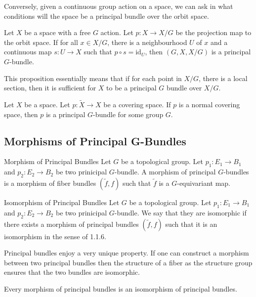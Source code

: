 \documentclass[a4paper]{article}
\begin{document}
Conversely, given a continuous group action on a space, we can ask in what conditions will the space be a principal bundle over the orbit space. 

\begin{prp}{}{} Let $X$ be a space with a free $G$ action. Let $p:X\to X/G$ be the projection map to the orbit space. If for all $x\in X/G$, there is a neighbourhood $U$ of $x$ and a continuous map $s:U\to X$ such that $p\circ s=\text{id}_U$, then $(G,X,X/G)$ is a principal $G$-bundle. 
\end{prp}

This proposition essentially means that if for each point in $X/G$, there is a local section, then it is sufficient for $X$ to be a principal $G$ bundle over $X/G$. 

\begin{prp}{}{} Let $X$ be a space. Let $p:\tilde{X}\to X$ be a covering space. If $p$ is a normal covering space, then $p$ is a principal $G$-bundle for some group $G$. 
\end{prp}

\subsection{Morphisms of Principal G-Bundles}
\begin{defn}{Morphism of Principal Bundles}{} Let $G$ be a topological group. Let $p_1:E_1\to B_1$ and $p_2:E_2\to B_2$ be two prinicipal $G$-bundle. A morphism of principal $G$-bundles is a morphism of fiber bundles $(\tilde{f},f)$ such that $\tilde{f}$ is a $G$-equivariant map. 
\end{defn}

\begin{defn}{Isomorphism of Principal Bundles}{} Let $G$ be a topological group. Let $p_1:E_1\to B_1$ and $p_2:E_2\to B_2$ be two prinicipal $G$-bundle. We say that they are isomorphic if there exists a morphism of principal bundles $(\tilde{f},f)$ such that it is an isomorphism in the sense of 1.1.6. 
\end{defn}

Principal bundles enjoy a very unique property. If one can construct a morphism between two principal bundles then the structure of a fiber as the structure group ensures that the two bundles are isomorphic. 

\begin{prp}{}{} Every morphism of principal bundles is an isomorphism of principal bundles. 
\end{prp}
\end{document}
